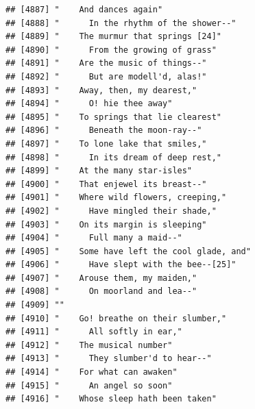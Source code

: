 \documentclass{article}\usepackage[]{graphicx}\usepackage[]{color}
\makeatletter
\newenvironment{kframe}{%
 \def\at@end@of@kframe{}%
 \ifinner\ifhmode%
  \def\at@end@of@kframe{\end{minipage}}%
  \begin{minipage}{\columnwidth}%
 \fi\fi%
 \def\FrameCommand##1{\hskip\@totalleftmargin \hskip-\fboxsep
 \colorbox{shadecolor}{##1}\hskip-\fboxsep
     \hskip-\linewidth \hskip-\@totalleftmargin \hskip\columnwidth}%
 \MakeFramed {\advance\hsize-\width
   \@totalleftmargin\z@ \linewidth\hsize
   \@setminipage}}%
 {\par\unskip\endMakeFramed%
 \at@end@of@kframe}
\newenvironment{knitrout}{}{} %
\makeatother
\begin{document}
\begin{knitrout}
\begin{kframe}
\begin{verbatim}
## [4887] "    And dances again"                                                        
## [4888] "      In the rhythm of the shower--"                                         
## [4889] "    The murmur that springs [24]"                                            
## [4890] "      From the growing of grass"                                             
## [4891] "    Are the music of things--"                                               
## [4892] "      But are modell'd, alas!"                                               
## [4893] "    Away, then, my dearest,"                                                 
## [4894] "      O! hie thee away"                                                      
## [4895] "    To springs that lie clearest"                                            
## [4896] "      Beneath the moon-ray--"                                                
## [4897] "    To lone lake that smiles,"                                               
## [4898] "      In its dream of deep rest,"                                            
## [4899] "    At the many star-isles"                                                  
## [4900] "    That enjewel its breast--"                                               
## [4901] "    Where wild flowers, creeping,"                                           
## [4902] "      Have mingled their shade,"                                             
## [4903] "    On its margin is sleeping"                                               
## [4904] "      Full many a maid--"                                                    
## [4905] "    Some have left the cool glade, and"                                      
## [4906] "      Have slept with the bee--[25]"                                         
## [4907] "    Arouse them, my maiden,"                                                 
## [4908] "      On moorland and lea--"                                                 
## [4909] ""                                                                            
## [4910] "    Go! breathe on their slumber,"                                           
## [4911] "      All softly in ear,"                                                    
## [4912] "    The musical number"                                                      
## [4913] "      They slumber'd to hear--"                                              
## [4914] "    For what can awaken"                                                     
## [4915] "      An angel so soon"                                                      
## [4916] "    Whose sleep hath been taken"                                             

\end{verbatim}
\end{kframe}
\end{knitrout}
\end{document}
